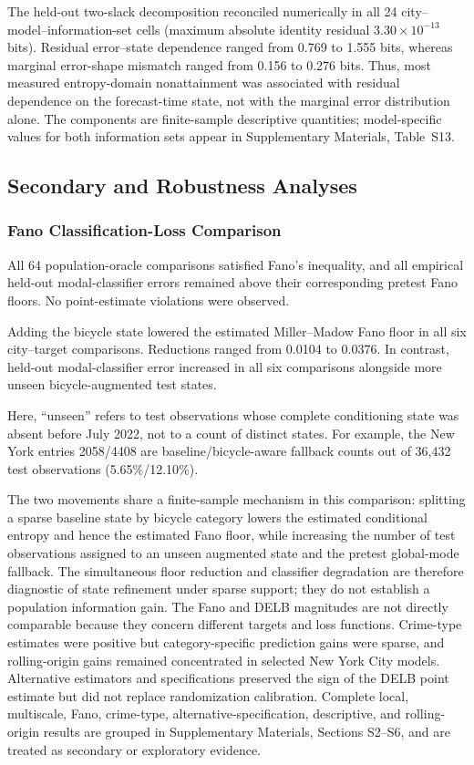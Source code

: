 \documentclass[applsci,article,accept,moreauthors]{Definitions/mdpi}
\newcommand{\FanoFloorReductionMax}{0.0376}
\newcommand{\FanoFloorReductionMin}{0.0104}
\newcommand{\FanoOracleRows}{64}
\begin{document}
{The held-out two-slack decomposition reconciled numerically in all 24
city--model--information-set cells (maximum absolute identity residual
\(3.30\times10^{-13}\) bits). Residual error--state dependence ranged from
0.769 to 1.555 bits, whereas marginal error-shape mismatch ranged from 0.156
to 0.276 bits. Thus, most measured entropy-domain nonattainment was associated
with residual dependence on the forecast-time state, not with the marginal
error distribution alone. The components are finite-sample descriptive
quantities; model-specific values for both information sets appear in
Supplementary Materials, Table~S13.}


\subsection{Secondary and Robustness Analyses}

\subsubsection*{Fano Classification-Loss Comparison}
\label{subsec:results_fano}
All \FanoOracleRows{} population-oracle comparisons satisfied Fano's inequality,
and all empirical held-out modal-classifier errors remained above their
corresponding pretest Fano floors. No point-estimate violations
were observed.

Adding the bicycle state lowered the estimated Miller--Madow Fano floor
in all six city--target comparisons. Reductions ranged from
\FanoFloorReductionMin{} to \FanoFloorReductionMax{}. In contrast, held-out
modal-classifier error increased in all six comparisons alongside more unseen
bicycle-augmented test states.

{Here, ``unseen'' refers to test observations whose complete conditioning
state was absent before July 2022, not to a count of distinct states. For
example, the New York entries 2058/4408 are baseline/bicycle-aware fallback
counts out of 36,432 test observations (5.65\%/12.10\%).}

{The two movements share a finite-sample mechanism in this comparison:
splitting a sparse baseline state by bicycle category lowers the estimated
conditional entropy and hence the estimated Fano floor, while increasing
the number of test observations assigned to an unseen augmented state and
the pretest global-mode fallback. The simultaneous floor reduction and
classifier degradation are therefore diagnostic of state refinement under
sparse support; they do not establish a population information gain.}
The Fano and DELB magnitudes are
not directly comparable because they concern different targets and loss
functions. Crime-type estimates were positive but category-specific
prediction gains were sparse, and rolling-origin gains remained concentrated
in selected New York City models. Alternative estimators and specifications
preserved the sign of the DELB point estimate but did not replace
randomization calibration. {Complete local, multiscale, Fano, crime-type,
alternative-specification, descriptive, and rolling-origin results are
grouped in Supplementary Materials, Sections S2--S6, and are treated as
secondary or exploratory evidence.}
\end{document}

